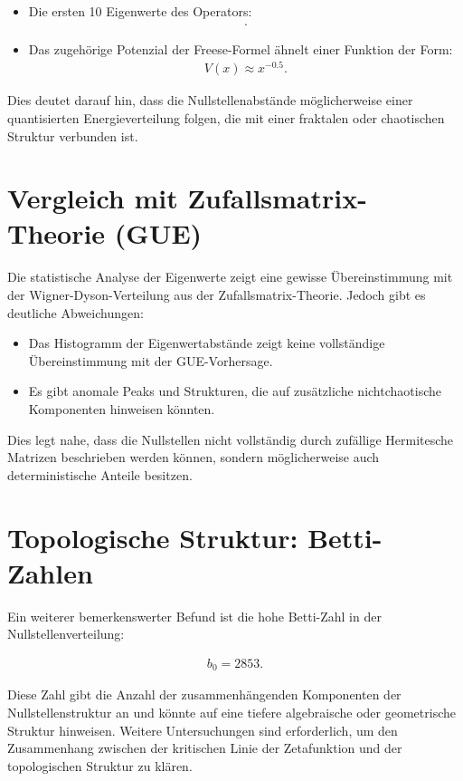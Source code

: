 \documentclass[a4paper,12pt]{article}
\begin{document}
\begin{itemize}
    \item Die ersten 10 Eigenwerte des Operators:
    \begin{align}
        [-0.3745, -0.3713, -0.3686, -0.3661, -0.3638, -0.3615, -0.3593, -0.3572, -0.3551, -0.3531].
    \end{align}
    \item Das zugehörige Potenzial der Freese-Formel ähnelt einer Funktion der Form:
    \begin{align}
        V(x) \approx x^{-0.5}.
    \end{align}
\end{itemize}

Dies deutet darauf hin, dass die Nullstellenabstände möglicherweise einer quantisierten Energieverteilung folgen, die mit einer fraktalen oder chaotischen Struktur verbunden ist.

\section{Vergleich mit Zufallsmatrix-Theorie (GUE)}
Die statistische Analyse der Eigenwerte zeigt eine gewisse Übereinstimmung mit der Wigner-Dyson-Verteilung aus der Zufallsmatrix-Theorie. Jedoch gibt es deutliche Abweichungen:

\begin{itemize}
    \item Das Histogramm der Eigenwertabstände zeigt keine vollständige Übereinstimmung mit der GUE-Vorhersage.
    \item Es gibt anomale Peaks und Strukturen, die auf zusätzliche nichtchaotische Komponenten hinweisen könnten.
\end{itemize}

Dies legt nahe, dass die Nullstellen nicht vollständig durch zufällige Hermitesche Matrizen beschrieben werden können, sondern möglicherweise auch deterministische Anteile besitzen.

\section{Topologische Struktur: Betti-Zahlen}
Ein weiterer bemerkenswerter Befund ist die hohe Betti-Zahl in der Nullstellenverteilung:

\begin{align}
    b_0 = 2853.
\end{align}

Diese Zahl gibt die Anzahl der zusammenhängenden Komponenten der Nullstellenstruktur an und könnte auf eine tiefere algebraische oder geometrische Struktur hinweisen. Weitere Untersuchungen sind erforderlich, um den Zusammenhang zwischen der kritischen Linie der Zetafunktion und der topologischen Struktur zu klären.
\end{document}
